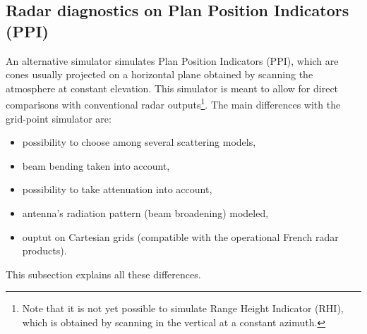 


\subsection{Radar diagnostics on Plan Position Indicators (PPI)}
An alternative simulator simulates Plan Position Indicators (PPI), which are cones usually projected on a horizontal plane obtained by scanning the atmosphere at constant elevation. This simulator is meant to allow for direct comparisons with conventional radar outputs\footnote{Note that it is not yet possible to simulate Range Height Indicator (RHI), which is obtained by scanning in the vertical at a constant azimuth.}. The main differences with the grid-point simulator are:
\begin{itemize}
\item possibility to choose among several scattering models,
\item beam bending taken into account,
\item possibility to take attenuation into account,
\item antenna's radiation pattern (beam broadening) modeled,
\item ouptut on Cartesian grids (compatible with the operational French radar products).
\end{itemize}
This subsection explains all these differences.  


